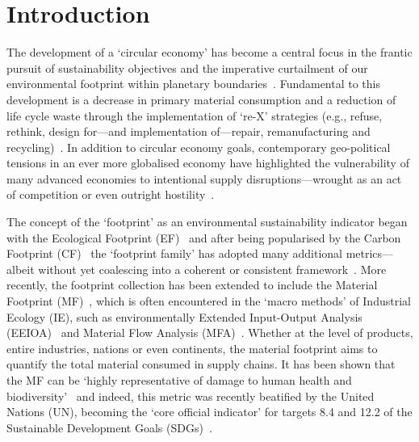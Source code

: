 \documentclass[a4paper,fleqn]{cas-dc}
\begin{document}
\section{Introduction}\label{sec:introduction}  
The development of a `circular economy' has become a central focus in the frantic pursuit of sustainability objectives and the imperative curtailment of our environmental footprint within planetary boundaries~\citep{eu2019greendeal, eu2020circ,nl2023ceplan,nl2016ceplan,pardo2018ce,ellenmacarthur2015ce}. Fundamental to this development is a decrease in primary material consumption and a reduction of life cycle waste through the implementation of `re-X' strategies (e.g., refuse, rethink, design for---and implementation of---repair, remanufacturing and recycling)~\citep{reike2018rex, eu2022ecodesign, eu2022repair, eu2015reman}. In addition to circular economy goals, contemporary geo-political tensions in an ever more globalised economy have highlighted the vulnerability of many advanced economies to intentional supply disruptions---wrought as an act of competition or even outright hostility~\citep{jrc2023supplychain,hartley2024cepolitics,berry2023crm}.

The concept of the `footprint' as an environmental sustainability indicator began with the Ecological Footprint (EF)~\citep{wackernagel1994ecologicalfootprint} and after being popularised by the Carbon Footprint (CF)~\citep{cucek2015environmentalfootprints} the `footprint family' has adopted many additional metrics---albeit without yet coalescing into a coherent or consistent framework~\citep{giampietro2014footprintstonowhere, vanham2019footprints,ridoutt2013footprints}. More recently, the footprint collection has been extended to include the Material Footprint (MF)~\citep{weidmann2013materialfootprint}, which is often encountered in the `macro methods' of Industrial Ecology (IE), such as environmentally Extended Input-Output Analysis (EEIOA)~\citep{lenzen2022materialfootprint} and Material Flow Analysis (MFA)~\citep{schaffartzik2013mfafootprint}. Whether at the level of products, entire industries, nations or even continents, the material footprint aims to quantify the total material consumed in supply chains. It has been shown that the MF can be `highly representative of damage to human health and biodiversity'~\citep{steinmann2017resourcefootprints} and indeed, this metric was recently beatified by the United Nations (UN), becoming the `core official indicator' for targets 8.4 and 12.2 of the Sustainable Development Goals (SDGs)~\citep{lenzen2022materialfootprint}.
\end{document}
